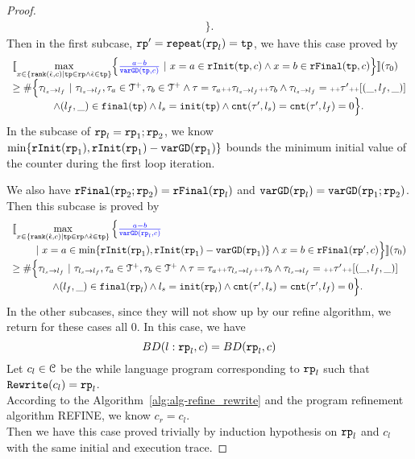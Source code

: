 \begin{proof}
\[\begin{array}{l}
    \Big\}.
    \end{array}
\]
Then in the first subcase, $\mathtt{rp}' = \mathtt{repeat}(\mathtt{rp}_l) = \mathtt{tp}$, we have this case proved by
\[
  \begin{array}{l}
    \econfig{
      \max\limits_{x \in \left\{ \locbound(\absevent, c) | \tpath \in \rprog \land \absevent \in \tpath \right\}}
      \left\{ \highlight{\frac{a - b}{\varGD(\tpath, c)}} ~\vert~
      x = a \in \rfinit(\tpath, c)
      \land x = b \in \rffinal(\tpath, c)
      \right\} 
    }(\trace_0) \\
    \geq
    \# \Big\{\trace_{l_s \to l_f} ~\vert~ \trace_{l_s \to l_f}, \trace_a \in \ftdom, \trace_b \in \ftdom
    \land \trace = \trace_a \tracecat \trace_{l_s \to l_f} \tracecat \trace_b
    \land \trace_{l_s \to l_f} = \tracecat \trace' \tracecat [(\_, l_f, \_)]
    \\ \qquad \qquad
    \land (l_{f}, \_) \in \absfinal(\tpath)
    \land l_s = \absinit(\tpath)
    \land \counter(\trace', l_s) = \counter(\trace', l_f) = 0 
    \Big\}.
    \end{array}
\]
In the subcase of $\mathtt{rp}_l = \mathtt{rp}_1; \mathtt{rp}_2$, 
we know 
$\min\{ \mathtt{rInit}(\mathtt{rp}_1), \mathtt{rInit}(\mathtt{rp}_1) - \mathtt{varGD}(\mathtt{rp}_1) \}$ bounds the minimum initial value of the counter during the first loop iteration.

We also have $\mathtt{rFinal}(\mathtt{rp}_2;\mathtt{rp}_2) = \mathtt{rFinal}(\mathtt{rp}_l)$ and $\mathtt{varGD}(\mathtt{rp}_l) = \mathtt{varGD}(\mathtt{rp}_1;\mathtt{rp}_2)$.
Then this subcase is proved by 
\[
  \begin{array}{l}
    \econfig{
      \max\limits_{x \in \left\{ \locbound(\absevent, c) | \tpath \in \rprog \land \absevent \in \tpath \right\}}
      \Big\{ \highlight{\frac{a - b}{\varGD(\rprog_l, c)}} 
      \\ \qquad
      ~\vert~
      x = a \in \min\{ \rfinit(\rprog_1), \rfinit(\rprog_1) - \varGD(\rprog_1) \}
      \land x = b \in \rffinal(\rprog', c)
      \Big\} 
    }(\trace_0) \\
    \geq
    \# \Big\{\trace_{l_s \to l_f} ~\vert~ \trace_{l_s \to l_f}, \trace_a \in \ftdom, \trace_b \in \ftdom
    \land \trace = \trace_a \tracecat \trace_{l_s \to l_f} \tracecat \trace_b
    \land \trace_{l_s \to l_f} = \tracecat \trace' \tracecat [(\_, l_f, \_)]
    \\ \qquad \qquad
    \land (l_{f}, \_) \in \absfinal(\rprog_l)
    \land l_s = \absinit(\rprog_l)
    \land \counter(\trace', l_s) = \counter(\trace', l_f) = 0 
    \Big\}.
    \end{array}
\]
In the other subcases, since they will not show up by our refine algorithm, we return for these cases all $0$.
In this case, we have
\[
  BD(l: \mathtt{rp}_l, c) = BD(\mathtt{rp}_l, c)
\]
Let $c_l \in \mathcal{C}$ be the while language program corresponding to $\mathtt{rp}_l$ such that $\mathtt{Rewrite}(c_l) = \mathtt{rp}_l$.
\\
According to the Algorithm~\ref{alg:alg-refine_rewrite} and the program refinement algorithm REFINE, we know
$c_r = c_l$.
\\
Then we have this case proved trivially by induction hypothesis on $\mathtt{rp}_l$ and $c_l$ with the same initial and execution trace.


\end{proof}
